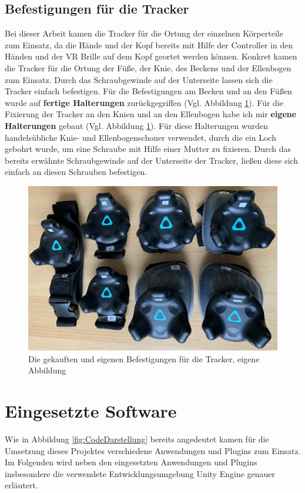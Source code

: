 \subsection{Befestigungen für die Tracker}\label{sec:TrackerBefestigung}
Bei dieser Arbeit kamen die Tracker für die Ortung der einzelnen Körperteile zum Einsatz, da die Hände und der Kopf bereits mit Hilfe der Controller in den Händen und der VR Brille auf dem Kopf geortet werden können. Konkret kamen die Tracker für die Ortung der Füße, der Knie, des Beckens und der Ellenbogen zum Einsatz. Durch das Schraubgewinde auf der Unterseite lassen sich die Tracker einfach befestigen. Für die Befestigungen am Becken und an den Füßen wurde auf \textbf{fertige Halterungen} zurückgegriffen (Vgl. Abbildung \ref{fig:Mounts}). Für die Fixierung der Tracker an den Knien und an den Ellenbogen habe ich mir \textbf{eigene Halterungen} gebaut (Vgl. Abbildung \ref{fig:Mounts}). Für diese Halterungen wurden handelsübliche Knie- und Ellenbogenschoner verwendet, durch die ein Loch gebohrt wurde, um eine Schraube mit Hilfe einer Mutter zu fixieren. Durch das bereits erwähnte Schraubgewinde auf der Unterseite der Tracker, ließen diese sich einfach an diesen Schrauben befestigen.
\begin{figure}[h]
	\centering
	\includegraphics[width=0.6\linewidth]{Bilder/A32_Mounts}
	\caption{Die gekauften und eigenen Befestigungen für die Tracker, eigene Abbildung}
	\label{fig:Mounts}
\end{figure}
\newpage
\section{Eingesetzte Software}\label{sec:Software}
Wie in Abbildung \ref{fig:CodeDarstellung} bereits angedeutet kamen für die Umsetzung dieses Projektes verschiedene Anwendungen und Plugins zum Einsatz. Im Folgenden wird neben den eingesetzten Anwendungen und Plugins insbesondere die verwendete Entwicklungsumgebung Unity Engine genauer erläutert.

